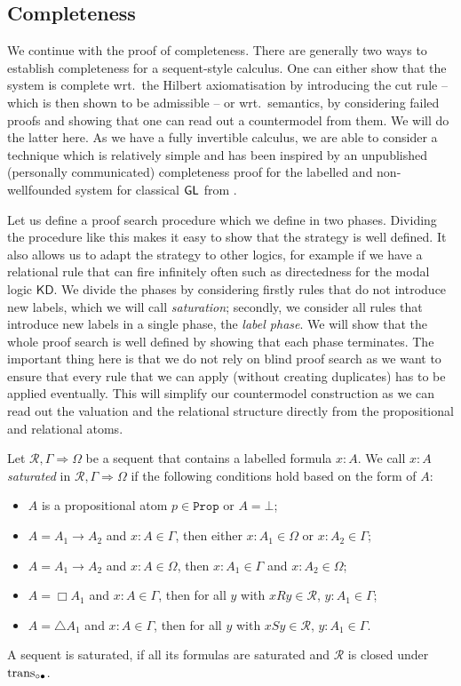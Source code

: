 \documentclass[runningheads,orivec]{llncs}
\newcommand{\GL}{\textnormal{\textsf{GL}}}
\newcommand{\transBi}{\textnormal{trans}_{\circ \bullet}}
\newcommand{\Ra}{\Rightarrow}
\newcommand{\R}{\mathcal{R}}
\newcommand{\Prop}{\mathtt{Prop}}
\begin{document}
\subsection{Completeness}

We continue with the proof of completeness. There are generally two ways to establish completeness for a sequent-style calculus. One can either show that the system is complete wrt.~the Hilbert axiomatisation by introducing the cut rule -- which is then shown to be admissible -- or wrt.~semantics, by considering failed proofs and showing that one can read out a countermodel from them. 
We will do the latter here.
As we have a fully invertible calculus, we are able to consider a technique which is relatively simple and has been inspired by an unpublished (personally communicated) completeness proof for the labelled and non-wellfounded system for classical $\GL$ from \cite{Das_et_al24}.


Let us define a proof search procedure which we define in two phases. Dividing the procedure like this makes it easy to show that the strategy is well defined. It also allows us to adapt the strategy to other logics, for example if we have a relational rule that can fire infinitely often such as directedness for the modal logic $\mathsf{KD}$. We divide the phases by considering firstly rules that do not introduce new labels, which we will call \emph{saturation}; secondly, we consider all rules that introduce new labels in a single phase, the \emph{label phase}.
We will show that the whole proof search is well defined by showing that each phase terminates. 
The important thing here is that we do not rely on blind proof search as we want to ensure that every rule that we can apply (without creating duplicates) has to be applied eventually. This will simplify our countermodel construction as we can read out the valuation and the relational structure directly from the propositional and relational atoms.

\begin{definition}[Saturation]
    Let $\R , \Gamma \Ra \Omega$ be a sequent that contains a labelled formula $x:A$. We call $x:A$ \emph{saturated} in $\R , \Gamma \Ra \Omega$ if the following conditions hold based on the form of $A$:
    \begin{itemize}
        \item[-] $A$ is a propositional atom $p \in \Prop$ or $A= \bot$;
        \item[-] $A= A_1 \to A_2$ and $x :A \in \Gamma$, then either $x:A_1 \in \Omega$ or $x: A_2 \in \Gamma$;
        \item[-] $A= A_1 \to A_2$ and $x :A \in \Omega$, then $x:A_1 \in \Gamma$ and $x: A_2 \in \Omega$;
        \item[-] $A = \Box A_1$ and $x :A \in \Gamma$, then for all $y$ with $xRy \in \R$, $y :A_1 \in \Gamma$;
        \item[-] $A = \triangle A_1$ and $x :A \in \Gamma$, then for all $y$ with $xSy \in \R$, $y :A_1 \in \Gamma$.
    \end{itemize}
    A sequent is saturated, if all its formulas are saturated and $\R$ is closed under $\transBi$.
\end{definition}
\end{document}
